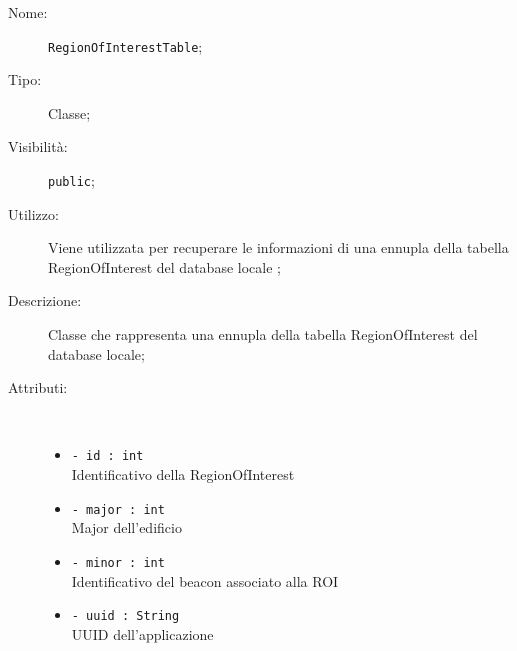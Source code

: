 \documentclass[../DefinizioneDiProdotto.tex]{subfiles}
\begin{document}
    \begin{description}
\item[Nome:] \texttt{RegionOfInterestTable};
\item[Tipo:] Classe;
\item[Visibilità:] \texttt{public};
\item[Utilizzo:] Viene utilizzata per recuperare le informazioni di una ennupla della tabella RegionOfInterest del database locale ;
\item[Descrizione:] Classe che rappresenta una ennupla della tabella RegionOfInterest del database locale;
\item[Attributi:] \
\begin{itemize}
\item \texttt{- id : int}\\
Identificativo della RegionOfInterest

\item \texttt{- major : int}\\
Major dell'edificio

\item \texttt{- minor : int}\\
Identificativo del beacon associato alla ROI

\item \texttt{- uuid : String}\\
UUID dell'applicazione


\end{itemize}
\end{description}
\end{document}
